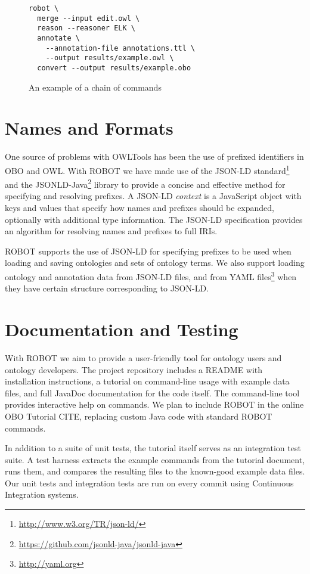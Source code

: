 \documentclass{icbo}
\begin{document}
\begin{figure}
\begin{verbatim}
robot \
  merge --input edit.owl \
  reason --reasoner ELK \
  annotate \
    --annotation-file annotations.ttl \
    --output results/example.owl \
  convert --output results/example.obo
\end{verbatim}
\caption{An example of a chain of commands}
\label{chain}
\end{figure}


\section{Names and Formats}

One source of problems with OWLTools has been the use of prefixed identifiers in OBO and OWL. With ROBOT we have made use of the JSON-LD standard\footnote{\url{http://www.w3.org/TR/json-ld/}} and the JSONLD-Java\footnote{\url{https://github.com/jsonld-java/jsonld-java}} library to provide a concise and effective method for specifying and resolving prefixes. A JSON-LD {\it context} is a JavaScript object with keys and values that specify how names and prefixes should be expanded, optionally with additional type information. The JSON-LD specification provides an algorithm for resolving names and prefixes to full IRIs.

ROBOT supports the use of JSON-LD for specifying prefixes to be used when loading and saving ontologies and sets of ontology terms. We also support loading ontology and annotation data from JSON-LD files, and from YAML files\footnote{\url{http://yaml.org}} when they have certain structure corresponding to JSON-LD.


\section{Documentation and Testing}

With ROBOT we aim to provide a user-friendly tool for ontology users and ontology developers. The project repository includes a README with installation instructions, a tutorial on command-line usage with example data files, and full JavaDoc documentation for the code itself. The command-line tool provides interactive help on commands. We plan to include ROBOT in the online OBO Tutorial CITE, replacing custom Java code with standard ROBOT commands.

In addition to a suite of unit tests, the tutorial itself serves as an integration test suite. A test harness extracts the example commands from the tutorial document, runs them, and compares the resulting files to the known-good example data files. Our unit tests and integration tests are run on every commit using Continuous Integration systems.
\end{document}
